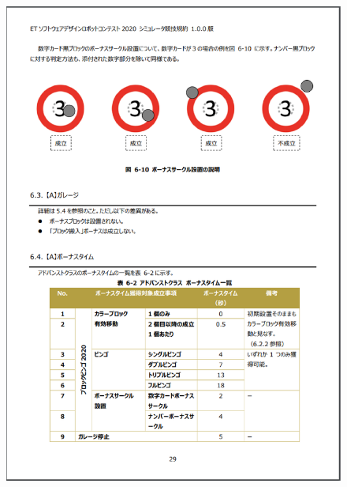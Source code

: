 \documentclass[uplatex, report, a4j, 10pt]{jsbook}
\begin{document}
\begin{figure}[tp]
    \begin{center}
    \includegraphics[width=\hsize]{specification/ET_16.eps}
    \end{center}
\end{figure}
\end{document}
